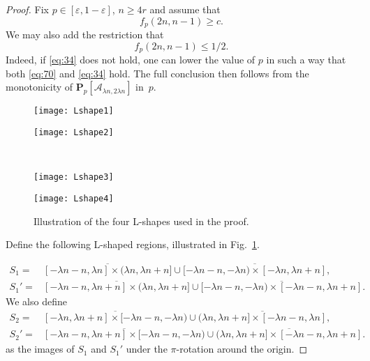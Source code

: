 \documentclass[12pt, twoside,a4paper,reqno]{amsart}
\theoremstyle{plain}
\theoremstyle{remark}
\theoremstyle{definition}
\newcommand{\eps}{\varepsilon}
\newcommand{\PP}{\mathbf{P}}
\newcommand{\Pp}[1]{\PP_p \left [ #1 \right ]}
\newcommand{\ol}{\overline}
\begin{document}
\begin{proof}
Fix $p\in[\eps,1-\eps]$, $n\ge4r$ and assume that 
\begin{equation}
  \label{eq:70}
  f_p(2n,n-1)\ge c.
\end{equation}
We may also add the restriction that  
\begin{equation}
  f_p(2n,n-1)\le 1/2.\label{eq:34}
\end{equation}
Indeed, if \eqref{eq:34} does not hold, one can lower the value of $p$ in such a
way that both \eqref{eq:70} and \eqref{eq:34} hold. The full conclusion then
follows from the monotonicity of $ \Pp{\mathcal A_{ \lambda n,2 \lambda n}}$ in~$p$.

\begin{figure}[htbp]
  \centering
  \begin{minipage}[t]{.35\textwidth}
    \centering
    \texttt{[image: Lshape1]}
  \end{minipage}
\begin{minipage}[t]{.35\textwidth}
    \centering
    \texttt{[image: Lshape2]}
  \end{minipage}
\\

\medskip

\begin{minipage}[t]{.35\textwidth}
    \centering
    \texttt{[image: Lshape3]}
  \end{minipage}
\begin{minipage}[t]{.35\textwidth}
    \centering
    \texttt{[image: Lshape4]}
  \end{minipage}

  \caption{Illustration of the four L-shapes used in the proof.}
  \label{fig:7}
\end{figure}

Define the following  L-shaped regions, illustrated in Fig.~\ref{fig:7}.

\begin{align}
  \label{eq:55}
   S_1=&\ol{[-\lambda n-n, \lambda n]\times (\lambda n, \lambda n+n]}
  \cup\ol{[-\lambda n-n, -\lambda n)\times [-\lambda n, \lambda n+n]},\\
  S_1'=&\ol{[-\lambda n-n, \lambda n+n]\times (\lambda n,\lambda n+n]}
  \cup\ol{[-\lambda n-n, -\lambda n)\times [-\lambda n-n,\lambda n+n]}.
 \end{align}
We also define
\begin{align}
 S_2=&\ol{[-\lambda n, \lambda n+n]\times [-\lambda n-n,-\lambda n)}
  \cup\ol{(\lambda n ,\lambda n+n]\times [- \lambda n-n, \lambda n]},\\
  S_2'=&\ol{[-\lambda n-n,\lambda n+n]\times [-\lambda n-n,-\lambda n)}
  \cup\ol{(\lambda n , \lambda n+n]\times [-\lambda n-n , \lambda n+n]}.
\end{align}
as the images of $S_1$ and $S_1'$ under the $\pi$-rotation around the origin.


\end{proof}
\end{document}
